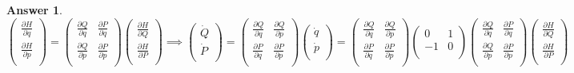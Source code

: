 \documentclass[a4paper]{article}
\newtheorem{ans}{Answer}[section]
\theoremstyle{new}
\begin{document}
\begin{ans}
$$\begin{pmatrix}\frac{\partial H}{\partial q}\\\frac{\partial H}{\partial p}\\\end{pmatrix}=\begin{pmatrix}\frac{\partial Q}{\partial q}&\frac{\partial P}{\partial q}\\\frac{\partial Q}{\partial p}&\frac{\partial P}{\partial p}\\\end{pmatrix}\begin{pmatrix}\frac{\partial H}{\partial Q}\\\frac{\partial H}{\partial P}\\\end{pmatrix}\implies\begin{pmatrix}\dot{Q}\\\dot{P}\\\end{pmatrix}=\begin{pmatrix}\frac{\partial Q}{\partial q}&\frac{\partial Q}{\partial p}\\\frac{\partial P}{\partial q}&\frac{\partial P}{\partial p}\\\end{pmatrix}\begin{pmatrix}\dot{q}\\\dot{p}\\\end{pmatrix}=\begin{pmatrix}\frac{\partial Q}{\partial q}&\frac{\partial Q}{\partial p}\\\frac{\partial P}{\partial q}&\frac{\partial P}{\partial p}\\\end{pmatrix}\begin{pmatrix}0&1\\-1&0\\\end{pmatrix}\begin{pmatrix}\frac{\partial Q}{\partial q}&\frac{\partial P}{\partial q}\\\frac{\partial Q}{\partial p}&\frac{\partial P}{\partial p}\\\end{pmatrix}\begin{pmatrix}\frac{\partial H}{\partial Q}\\\frac{\partial H}{\partial P}\\\end{pmatrix}$$

\end{ans}
\end{document}

